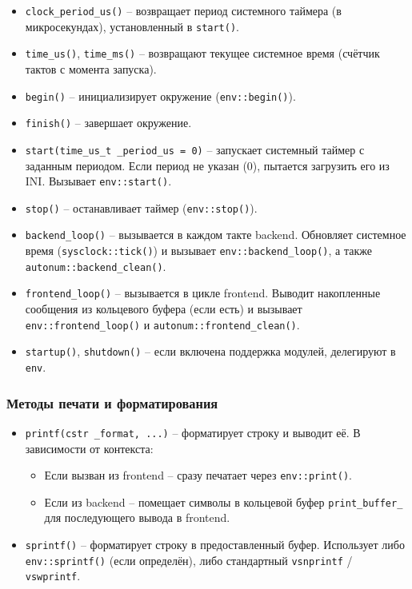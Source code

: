 \documentclass[a4paper,12pt]{article}
\begin{document}
\begin{itemize}
    \item \texttt{clock\_period\_us()} -- возвращает период системного таймера (в микросекундах), установленный в \texttt{start()}.
    \item \texttt{time\_us()}, \texttt{time\_ms()} -- возвращают текущее системное время (счётчик тактов с момента запуска).
    \item \texttt{begin()} -- инициализирует окружение (\texttt{env::begin()}).
    \item \texttt{finish()} -- завершает окружение.
    \item \texttt{start(time\_us\_t \_period\_us = 0)} -- запускает системный таймер с заданным периодом. Если период не указан (0), пытается загрузить его из INI. Вызывает \texttt{env::start()}.
    \item \texttt{stop()} -- останавливает таймер (\texttt{env::stop()}).
    \item \texttt{backend\_loop()} -- вызывается в каждом такте backend. Обновляет системное время (\texttt{sysclock::tick()}) и вызывает \texttt{env::backend\_loop()}, а также \texttt{autonum::backend\_clean()}.
    \item \texttt{frontend\_loop()} -- вызывается в цикле frontend. Выводит накопленные сообщения из кольцевого буфера (если есть) и вызывает \texttt{env::frontend\_loop()} и \texttt{autonum::frontend\_clean()}.
    \item \texttt{startup()}, \texttt{shutdown()} -- если включена поддержка модулей, делегируют в \texttt{env}.
\end{itemize}

\subsubsection{Методы печати и форматирования}

\begin{itemize}
    \item \texttt{printf(cstr \_format, ...)} -- форматирует строку и выводит её. В зависимости от контекста:
        \begin{itemize}
            \item Если вызван из frontend -- сразу печатает через \texttt{env::print()}.
            \item Если из backend -- помещает символы в кольцевой буфер \texttt{print\_buffer\_} для последующего вывода в frontend.
        \end{itemize}
    \item \texttt{sprintf()} -- форматирует строку в предоставленный буфер. Использует либо \texttt{env::sprintf()} (если определён), либо стандартный \texttt{vsnprintf} / \texttt{vswprintf}.
\end{itemize}
\end{document}
